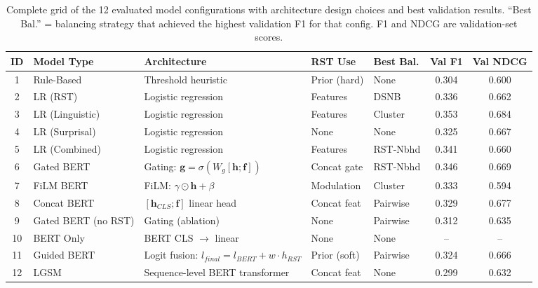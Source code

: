 \documentclass[11pt,a4paper]{article}
\begin{document}
\begin{table}[h!]
    \centering
    \small
    \caption{Complete grid of the 12 evaluated model configurations with architecture design choices and best validation results. ``Best Bal.'' = balancing strategy that achieved the highest validation F1 for that config. F1 and NDCG are validation-set scores.}
    \label{tab:model_configs}
    \begin{tabular}{c l l l l c c}
        \toprule
        \textbf{ID} & \textbf{Model Type} & \textbf{Architecture} & \textbf{RST Use} & \textbf{Best Bal.} & \textbf{Val F1} & \textbf{Val NDCG} \\
        \midrule
        1  & Rule-Based      & Threshold heuristic             & Prior (hard)   & None          & 0.304 & 0.600 \\
        2  & LR (RST)        & Logistic regression             & Features       & DSNB          & 0.336 & 0.662 \\
        3  & LR (Linguistic) & Logistic regression             & Features       & Cluster       & 0.353 & 0.684 \\
        4  & LR (Surprisal)  & Logistic regression             & None           & None          & 0.325 & 0.667 \\
        5  & LR (Combined)   & Logistic regression             & Features       & RST-Nbhd      & 0.341 & 0.660 \\
        6  & Gated BERT      & Gating: $\mathbf{g}=\sigma(W_g[\mathbf{h};\mathbf{f}])$ & Concat gate & RST-Nbhd & 0.346 & 0.669 \\
        7  & FiLM BERT       & FiLM: $\gamma \odot \mathbf{h} + \beta$     & Modulation & Cluster  & 0.333 & 0.594 \\
        8  & Concat BERT     & $[\mathbf{h}_{CLS};\mathbf{f}]$ linear head & Concat feat & Pairwise & 0.329 & 0.677 \\
        9  & Gated BERT (no RST) & Gating (ablation)           & None           & Pairwise      & 0.312 & 0.635 \\
        10 & BERT Only       & BERT CLS $\rightarrow$ linear   & None           & None          & --    & --    \\
        11 & Guided BERT     & Logit fusion: $l_{final}=l_{BERT}+w \cdot h_{RST}$ & Prior (soft) & Pairwise & 0.324 & 0.666 \\
        12 & LGSM            & Sequence-level BERT transformer & Concat feat    & None          & 0.299 & 0.632 \\
        \bottomrule
    \end{tabular}
\end{table}
\end{document}
